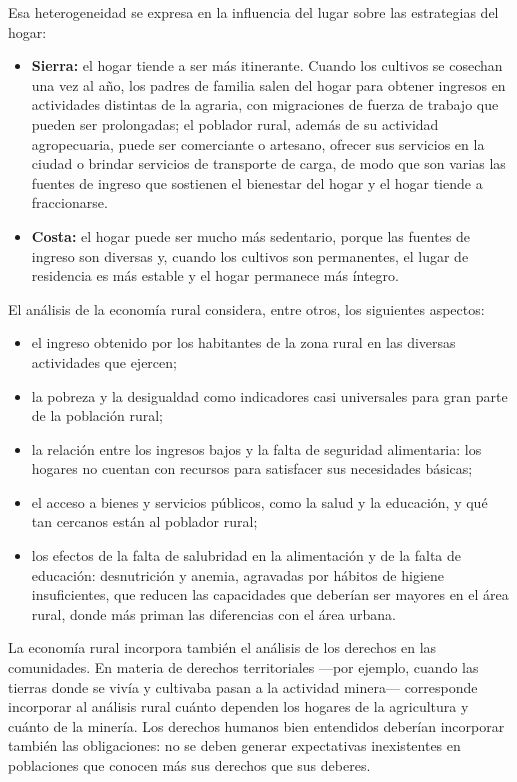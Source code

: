 \documentclass[
  man,
  floatsintext,
  longtable,
  a4paper,
  nolmodern,
  notxfonts,
  notimes,
  12pt,
  colorlinks=true,linkcolor=blue,citecolor=blue,urlcolor=blue]{apa7}
\providecommand{\tightlist}{%
  \setlength{\itemsep}{0pt}\setlength{\parskip}{0pt}}
\begin{document}
Esa heterogeneidad se expresa en la influencia del lugar sobre las
estrategias del hogar:

\begin{itemize}
\item
  \textbf{Sierra:} el hogar tiende a ser más itinerante. Cuando los
  cultivos se cosechan una vez al año, los padres de familia salen del
  hogar para obtener ingresos en actividades distintas de la agraria,
  con migraciones de fuerza de trabajo que pueden ser prolongadas; el
  poblador rural, además de su actividad agropecuaria, puede ser
  comerciante o artesano, ofrecer sus servicios en la ciudad o brindar
  servicios de transporte de carga, de modo que son varias las fuentes
  de ingreso que sostienen el bienestar del hogar y el hogar tiende a
  fraccionarse.
\item
  \textbf{Costa:} el hogar puede ser mucho más sedentario, porque las
  fuentes de ingreso son diversas y, cuando los cultivos son
  permanentes, el lugar de residencia es más estable y el hogar
  permanece más íntegro.
\end{itemize}

El análisis de la economía rural considera, entre otros, los siguientes
aspectos:

\begin{itemize}
\tightlist
\item
  el ingreso obtenido por los habitantes de la zona rural en las
  diversas actividades que ejercen;
\item
  la pobreza y la desigualdad como indicadores casi universales para
  gran parte de la población rural;
\item
  la relación entre los ingresos bajos y la falta de seguridad
  alimentaria: los hogares no cuentan con recursos para satisfacer sus
  necesidades básicas;
\item
  el acceso a bienes y servicios públicos, como la salud y la educación,
  y qué tan cercanos están al poblador rural;
\item
  los efectos de la falta de salubridad en la alimentación y de la falta
  de educación: desnutrición y anemia, agravadas por hábitos de higiene
  insuficientes, que reducen las capacidades que deberían ser mayores en
  el área rural, donde más priman las diferencias con el área urbana.
\end{itemize}

La economía rural incorpora también el análisis de los derechos en las
comunidades. En materia de derechos territoriales ---por ejemplo, cuando
las tierras donde se vivía y cultivaba pasan a la actividad minera---
corresponde incorporar al análisis rural cuánto dependen los hogares de
la agricultura y cuánto de la minería. Los derechos humanos bien
entendidos deberían incorporar también las obligaciones: no se deben
generar expectativas inexistentes en poblaciones que conocen más sus
derechos que sus deberes.
\end{document}
